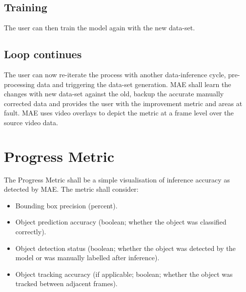 \documentclass[conference]{IEEEtran}
\def\figref#1{Fig.~\ref{#1}}
\begin{document}
\subsection{Training}
The user can then train the model again with the new data-set. 

\subsection{Loop continues}
The user can now re-iterate the process with another data-inference cycle, pre-processing data and triggering the data-set generation. MAE shall learn the changes with new data-set against the old, backup the accurate manually corrected data and provides the user with the improvement metric and areas at fault. MAE uses video overlays to depict the metric at a frame level over the source video data.

\section{Progress Metric}
The Progress Metric shall be a simple visualisation of inference accuracy as detected by MAE. The metric shall consider:
\begin{itemize}
	\item Bounding box precision (percent).
	\item Object prediction accuracy (boolean; whether the object was classified correctly).
	\item Object detection status (boolean; whether the object was detected by the model or was manually labelled after inference).
	\item Object tracking accuracy (if applicable; boolean; whether the object was tracked between adjacent frames).
\end{itemize}



\end{document}
